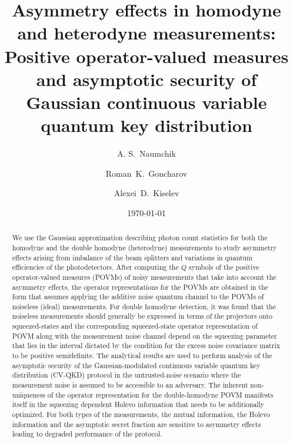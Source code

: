 \documentclass[%
reprint,
superscriptaddress,
 amsmath,amssymb,amsfonts,
 aps,
 pra,
 longbibliography
]{revtex4-2}
\begin{document}
\title{
  Asymmetry effects in homodyne and heterodyne measurements:
  Positive operator-valued measures and asymptotic security of
  Gaussian continuous variable quantum key distribution
}

\author{A. S.~Naumchik}


\author{Roman~K.~Goncharov}


\author{Alexei~D.~Kiselev}


\date{\today}

\begin{abstract}
  We use the Gaussian approximation describing
  photon count statistics for both the homodyne and the double
  homodyne (heterodyne) measurements to study asymmetry effects
  arising from imbalance of the beam splitters and
  variations in quantum efficiencies of the photodetectors.
  After computing the $Q$ symbols of
  the positive operator-valued measures (POVMs)
  of noisy measurements that take into account the asymmetry effects,
  the operator representations for the POVMs
  are obtained in the form that assumes applying the additive noise quantum channel
  to the POVMs of noiseless (ideal) measurements.
  For double homodyne detection,
  it was found that the noiseless measurements
  should generally be expressed in terms of the projectors onto squeezed-states 
  and the corresponding squeezed-state operator representation of POVM
  along with the measurement noise channel depend on the squeezing parameter
  that lies in the interval dictated by the condition for the excess noise covariance matrix to be
  positive semidefinite.
  The analytical results
are used to perform analysis of the asymptotic security of the
Gaussian-modulated
continuous variable quantum key distribution (CV-QKD) protocol in the untrusted-noise scenario
where the measurement noise is assumed to be accessible to an adversary.
The inherent non-uniqueness of the operator representation for
the double-homodyne POVM 
manifests itself in the squeezing dependent Holevo information
that needs to be additionally optimized.
For both
types of the measurements,
the mutual information, the Holevo information and the asymptotic secret fraction
are sensitive to asymmetry effects leading to degraded performance of the protocol.
\end{abstract}
 
\end{document}
